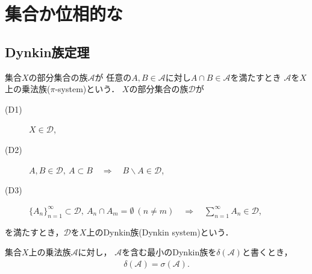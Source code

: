 \section{集合か位相的な}
\subsection{Dynkin族定理}
	\begin{screen}
		\begin{dfn}\label{def:Dynkin_system_theorem}
			集合$X$の部分集合の族$\mathscr{A}$が
			任意の$A,B \in \mathscr{A}$に対し$A \cap B \in \mathscr{A}$を満たすとき
			$\mathscr{A}$を$X$上の乗法族($\pi$-system)という．
			$X$の部分集合の族$\mathscr{D}$が
			\begin{description}
				\item[(D1)] $X \in \mathscr{D}$,
				\item[(D2)] $A,B \in \mathscr{D},
					\ A \subset B \quad \Longrightarrow \quad B \backslash A \in \mathscr{D}$,
				\item[(D3)] $\{A_n\}_{n=1}^\infty \subset \mathscr{D},
					\ A_n \cap A_m = \emptyset\ (n \neq m)
					\quad \Longrightarrow \quad \sum_{n=1}^\infty A_n \in \mathscr{D}$,
			\end{description}
			を満たすとき，$\mathscr{D}$を$X$上のDynkin族(Dynkin system)という．
		\end{dfn}
	\end{screen}
	
	\begin{screen}
		\begin{dfn}[Dynkin族定理]\label{thm:Dynkin_system_theorem}
			集合$X$上の乗法族$\mathscr{A}$に対し，
			$\mathscr{A}$を含む最小のDynkin族を$\delta(\mathscr{A})$と書くとき，
			\begin{align}
				\delta(\mathscr{A}) = \sigma(\mathscr{A}).
			\end{align}
		\end{dfn}
	\end{screen}
	
